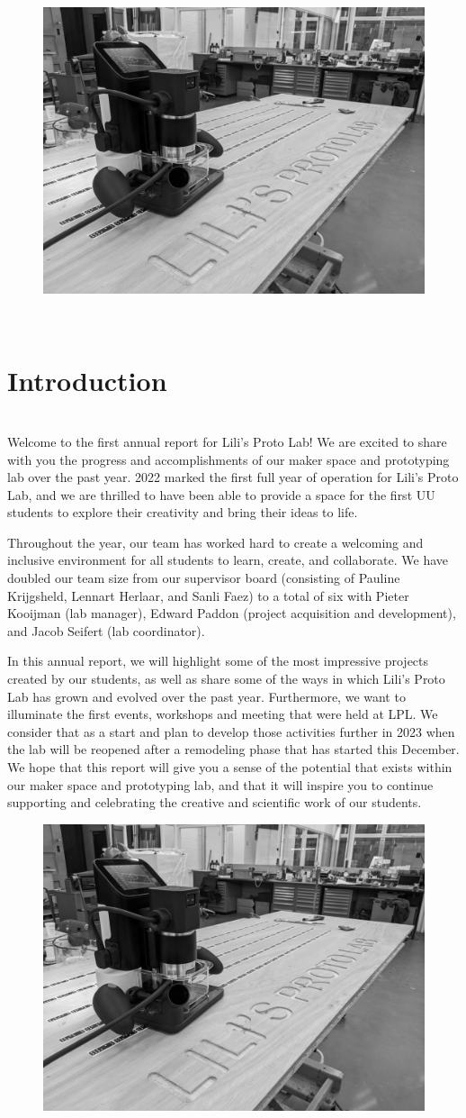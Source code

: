 \documentclass{report}
\newcommand\pagetitle{SectionTitle}
\newcommand{\LPLsection}[1]{%
\begin{figure}%
    \centering%
    \includegraphics[height=\textheight]{design_images/LPL_shaper.jpg}%
\end{figure}%
\clearpage%
\,\vspace{\textheight/3}%
\renewcommand\pagetitle{#1}%
\section*{\centering \pagetitle}%
\addcontentsline{toc}{section}{\protect\numberline{}\pagetitle}%
\clearpage%
}
\begin{document}
\LPLsection{Introduction}

 \\

Welcome to the first annual report for Lili's Proto Lab! We are excited to share with you the progress and accomplishments of our maker space and prototyping lab over the past year. 2022 marked the first full year of operation for Lili's Proto Lab, and we are thrilled to have been able to provide a space for the first UU students to explore their creativity and bring their ideas to life.

Throughout the year, our team has worked hard to create a welcoming and inclusive environment for all students to learn, create, and collaborate. We have doubled our team size from our supervisor board (consisting of Pauline Krijgsheld, Lennart Herlaar, and Sanli Faez) to a total of six with Pieter Kooijman (lab manager), Edward Paddon (project acquisition and development), and Jacob Seifert (lab coordinator). 

In this annual report, we will highlight some of the most impressive projects created by our students, as well as share some of the ways in which Lili's Proto Lab has grown and evolved over the past year. Furthermore, we want to illuminate the first events, workshops and meeting that were held at LPL. We consider that as a start and plan to develop those activities further in 2023 when the lab will be reopened after a remodeling phase that has started this December. We hope that this report will give you a sense of the potential that exists within our maker space and prototyping lab, and that it will inspire you to continue supporting and celebrating the creative and scientific work of our students. 


\clearpage

\begin{figure}
    \centering
    \includegraphics[height=\textheight]{design_images/LPL_shaper.jpg}
\end{figure}
\clearpage
\,\vspace{\textheight/3}
\renewcommand\pagetitle{Overview}   %
\end{document}

